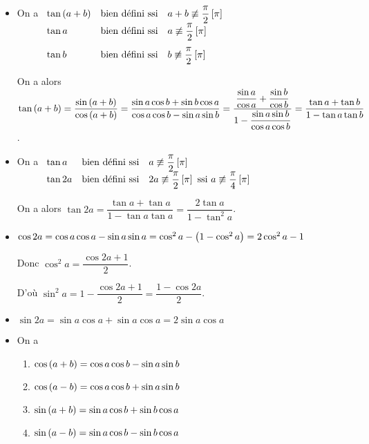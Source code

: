 \begin{itemize}
\item On a \(\begin{array}[t]{lll}
\tan\left(a+b\right) & \text{bien défini ssi} & a+b\not\equiv\dfrac{\pi}{2}\left[\pi\right] \\
\tan a & \text{bien défini ssi} & a\not\equiv\dfrac{\pi}{2}\left[\pi\right] \\[1em]
\tan b & \text{bien défini ssi} & b\not\equiv\dfrac{\pi}{2}\left[\pi\right]
\end{array}\)

On a alors \(\tan\left(a+b\right)=\dfrac{\sin\left(a+b\right)}{\cos\left(a+b\right)}=\dfrac{\sin a\cos b+\sin b\cos a}{\cos a\cos b-\sin a\sin b}=\dfrac{\dfrac{\sin a}{\cos a}+\dfrac{\sin b}{\cos b}}{1-\dfrac{\sin a\sin b}{\cos a\cos b}}=\dfrac{\tan a+\tan b}{1-\tan a\tan b}\).

\item On a \(\begin{array}[t]{lll}
\tan a & \text{bien défini ssi} & a\not\equiv\dfrac{\pi}{2}\left[\pi\right] \\
\tan2a & \text{bien défini ssi} & 2a\not\equiv\dfrac{\pi}{2}\left[\pi\right]\text{ ssi }a\not\equiv\dfrac{\pi}{4}\left[\pi\right]
\end{array}\)

On a alors \(\tan2a=\dfrac{\tan a+\tan a}{1-\tan a\tan a}=\dfrac{2\tan a}{1-\tan^2a}\).

\item \(\cos2a=\cos a\cos a-\sin a\sin a=\cos^2a-\left(1-\cos^2a\right)=2\cos^2a-1\)

Donc \(\cos^2a=\dfrac{\cos2a+1}{2}\).

D'où \(\sin^2a=1-\dfrac{\cos2a+1}{2}=\dfrac{1-\cos2a}{2}\).

\item \(\sin2a=\sin a\cos a+\sin a\cos a=2\sin a\cos a\)

\item On a \begin{enumerate}
\item \(\cos\left(a+b\right)=\cos a\cos b-\sin a\sin b\)

\item \(\cos\left(a-b\right)=\cos a\cos b+\sin a\sin b\)

\item \(\sin\left(a+b\right)=\sin a\cos b+\sin b\cos a\)

\item \(\sin\left(a-b\right)=\sin a\cos b-\sin b\cos a\)
\end{enumerate}


\end{itemize}
